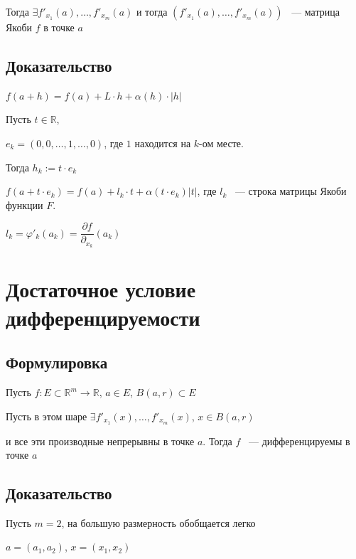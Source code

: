 \documentclass{article}
\begin{document}
            Тогда $\exists f'_{x_1}(a), \ldots, f'_{x_m}(a)$ и тогда $(f'_{x_1}(a), \ldots, f'_{x_m}(a))$ ~--- матрица Якоби $f$ в точке $a$
            
        \subsection{Доказательство}
        
            $f(a + h) = f(a) + L \cdot h + \alpha(h) \cdot |h|$
            
            Пусть $t \in \mathbb{R}$, 
            
            $e_k = (0, 0, \ldots, 1, \ldots, 0)$, где $1$ находится на $k$-ом месте.
            
            Тогда $h_k := t \cdot e_k$
            
            $f(a + t \cdot e_k) = f(a) + l_k \cdot t + \alpha(t \cdot e_k) |t|$, где $l_k$ ~--- строка матрицы Якоби функции $F$.
            
            $l_k = \varphi'_k (a_k) = \dfrac{\partial f}{\partial_{x_k}} (a_k)$
            
    \newpage
    
    \section{Достаточное условие дифференцируемости}
    
        \subsection{Формулировка}
        
            Пусть $f : E \subset \mathbb{R}^m \rightarrow \mathbb{R}$, $a \in E$, $B(a, r) \subset E$
            
            Пусть в этом шаре $\exists f'_{x_1} (x), \ldots, f'_{x_m} (x)$, $x \in B(a, r)$
            
            и все эти производные непрерывны в точке $a$. Тогда $f$ ~--- дифференцируемы в точке $a$
            
        \subsection{Доказательство}
        
            Пусть $m = 2$, на большую размерность обобщается легко
            
            $a = (a_1, a_2)$, $x = (x_1, x_2)$
            
\end{document}
